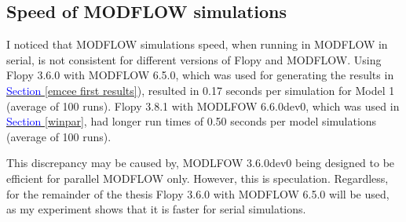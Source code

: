 \subsection{Speed of MODFLOW simulations}
I noticed that MODFLOW simulations speed, when running in MODFLOW in serial, is not consistent for different versions of Flopy and MODFLOW.  
Using Flopy 3.6.0 with MODFLOW 6.5.0, which was used for generating the results in \hyperref[emcee first results]{\textcolor{blue}{Section }\ref{emcee first results}}),  resulted in 0.17 seconds per simulation for Model 1 (average of 100 runs). Flopy 3.8.1 with MODLFOW 6.6.0dev0, which was used in \hyperref[winpar]{\textcolor{blue}{Section }\ref{winpar}}, had longer run times of 0.50 seconds per model simulations (average of 100 runs). 

This discrepancy may be caused by,  MODLFOW 3.6.0dev0 being designed to be efficient for parallel MODFLOW only. However, this is speculation. Regardless, for the remainder of the thesis Flopy 3.6.0 with MODFLOW 6.5.0 will be used, as my experiment shows that it is faster for serial simulations. 